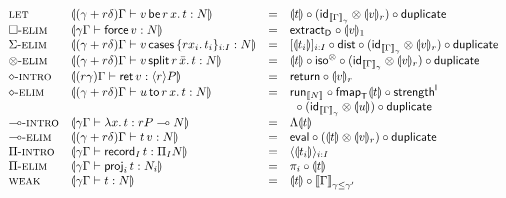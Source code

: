 \documentclass[acmsmall,review,anonymous]{acmart}\settopmatter{printfolios=true,printccs=false,printacmref=false}
\theoremstyle{remark}
\begin{document}
\[
\begin{array}{llcl}
\rlet %
  & \dent {\pCompTy {\gamma + r\delta} \Gamma {\qlet r x v t} {N}}
  & = & \dent t
  \comp (\tid[\Den \Gamma \gamma] \otimes \denv v r)
  \comp \duplicate
\\
\relim\Box
  & \dent {\qCompTy \gamma \Gamma {\force v} {N}}
  & = & \extract[\D] \comp \denv v 1
\\
\relim\GS
  & \dent {\pCompTy {\gamma + r\delta} \Gamma {\caser v \{r x_i.\, t_i\}_{i:I}} {N}}
  & = & [\dent {t_i}]_{i:I} \comp \tdist
  \comp (\tid[\Den \Gamma \gamma] \otimes \denv v r)
  \comp \duplicate
\\
\relim\otimes
  & \dent {\pCompTy {\gamma + r\delta} \Gamma {\qsplits r v {\bar x} t} {N}}
  & = & \dent t \comp \isot
  \comp (\tid[\Den \Gamma \gamma] \otimes \denv v r)
  \comp \duplicate
\\
\rintro\diamond
  & \dent {\pCompTy {r\gamma} \Gamma {\ret v} {\compty r P}}
  & = & \treturn \comp \denv v r
\\
\relim\diamond
  & \dent {\pCompTy {\gamma + r\delta} \Gamma {\qbind r x u t} {N}}
  & = & \run[\den N] \comp \fmapt[\T]{\dent t} \comp \strengthl
\\ &&& {~}
  \comp (\tid[\Den \Gamma \gamma] \otimes \dent u)
  \comp \duplicate
\\
\rintro\lolli
  & \dent {\qCompTy \gamma \Gamma {\lam x t} {\qfun r P N}}
  & = & \Lambda \dent t
\\
\relim\lolli
  & \dent{\pCompTy {\gamma + r\delta} \Gamma {\app t v} N}
  & = & \teval \comp (\dent t \otimes \denv v r) \comp \duplicate
\\
\rintro\Pi
  & \dent {\qCompTy \gamma \Gamma {\recrd I t} {\rect I N}}
  & = & \langle \dent {t_i} \rangle_{i:I}
\\
\relim\Pi
  & \dent {\qCompTy \gamma \Gamma {\proj i t} {N_i}}
  & = & \pi_i \comp \dent t
\\
\rweak
  & \dent {\qCompTy \gamma \Gamma t N}
  & = & \dent t \comp \Den \Gamma {\gamma \leq \gamma'}
\\
\end{array}
\]
\end{document}
